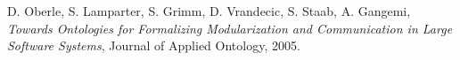 \documentclass[12pt]{report}			%
\begin{document}


	\begin{thebibliography}{}	%
	
  		D. Oberle, S. Lamparter, S. Grimm, D. Vrandecic, S. Staab, A. Gangemi,
  		\newblock \textit{Towards Ontologies for Formalizing Modularization and Communication in Large Software Systems}, 
 		\newblock Journal of Applied Ontology, 2005.
 		
 	\end{thebibliography}
  
 	\listoffigures	%
	\listoftables
	
	
\end{document}
